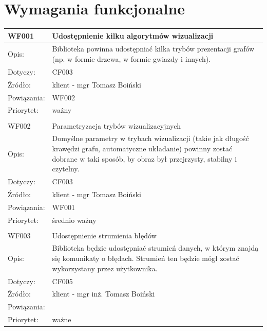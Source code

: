 \documentclass[a4paper,10pt]{article}
\begin{document}
\section{Wymagania funkcjonalne}


\begin{center}

\begin{tabular}{|m{3cm}|m{9cm}|} \hline

WF001 & Udostępnienie kilku algorytmów wizualizacji \\ \hline
Opis: & Biblioteka powinna udostępniać kilka trybów prezentacji grafów (np. w formie drzewa, w formie gwiazdy i innych).    \\ \hline
Dotyczy: & CF003 \\ \hline
Źródło: & klient - mgr Tomasz Boiński \\ \hline
Powiązania: &WF002 \\ \hline
Priorytet: &  ważny\\ \hline

\multicolumn{2}{c}{} \\
 \hline

WF002 & Parametryzacja trybów wizualizacyjnych \\ \hline
Opis: & Domyślne parametry w trybach wizualizacji (takie jak długość krawędzi grafu, automatyczne układanie) powinny zostać dobrane w taki sposób, by obraz był przejrzysty, stabilny i czytelny.    \\ \hline
Dotyczy: & CF003 \\ \hline
Źródło: &  klient - mgr Tomasz Boiński\\ \hline
Powiązania: & WF001 \\ \hline
Priorytet: & średnio ważny \\ \hline

\multicolumn{2}{c}{} \\
 \hline

WF003 & Udostępnienie strumienia błędów \\ \hline
Opis: &   Biblioteka będzie udostępniać strumień danych, w którym znajdą się komunikaty o błędach. Strumień ten będzie mógł zostać wykorzystany przez użytkownika. \\ \hline
Dotyczy: &  CF005  \\ \hline
Źródło: & klient - mgr inż. Tomasz Boiński \\ \hline
Powiązania: & \\ \hline
Priorytet: & ważne \\ \hline

\end{tabular}

\end{center}
\end{document}
